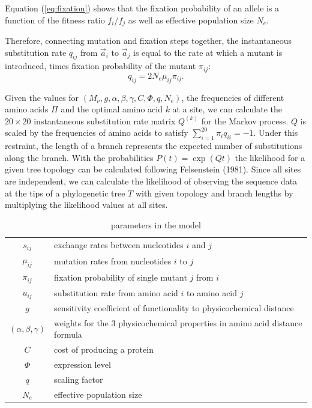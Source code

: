\documentclass[13pt]{article}
\newcommand{\avec}{\ensuremath{\vec{a}}\xspace}
\begin{document}
Equation (\ref{eq:fixation}) shows that the fixation probability of an allele is a function of the fitness ratio $f_i/f_j$ as well as effective population size $N_e$.


Therefore, connecting mutation and fixation steps together, the instantaneous substitution rate $q_{ij}$ from $\avec_i$ to $\avec_j$ is equal to the rate at which a mutant is introduced,  times fixation probability of the mutant $\pi_{ij}$:
\begin{equation}
q_{ij} = 2N_e \mu_{ij} \pi_{ij}.
\label{eq:subrate}
\end{equation}


Given the values for $\left(M_{\nu},g, \alpha, \beta, \gamma, C, \Phi, q, N_e\right)$, the frequencies of different amino acids $\Pi$ and the optimal amino acid $k$ at a site, we can calculate the $20 \times 20$ instantaneous substitution rate matrix $Q^{(k)}$ for the Markov process. 
$Q$ is scaled by the frequencies of amino acids to satisfy $\sum_{i=1}^{20} \pi_i q_{ii}= -1$.
Under this restraint, the length of a branch represents the expected number of substitutions along the branch.
With the probabilities $P(t)  = \exp\left(Q t\right)$ the likelihood for a given tree topology can be calculated following Felsenstein (1981).
Since all sites are independent, we can calculate the likelihood of observing the sequence data at the tips of a phylogenetic tree $T$ with given topology and branch lengths by multiplying the likelihood values at all sites.\\

\begin{table}[h]
\centering
\caption{parameters in the model}
\begin{tabular}{ c p{10cm} }
\hline
$s_{ij}$ & exchange rates between nucleotides $i$ and $j$ \\
$\mu_{ij}$ & mutation rates from nucleotides $i$ to $j$\\
$\pi_{ij}$ & fixation probability of single mutant $j$ from $i$\\
$u_{ij}$ & substitution rate from amino acid $i$ to amino acid $j$\\
$g$       & sensitivity coefficient of functionality to physicochemical distance \\
$(\alpha,\beta,\gamma)$ & weights for the 3 physicochemical properties in amino acid distance formula \\
$C$ & cost of producing a protein\\
$\Phi$ & expression level \\
$q$ & scaling factor \\
$N_e$ & effective population size \\
\hline
\end{tabular}

\label{tb: para}
\end{table}
\end{document}
